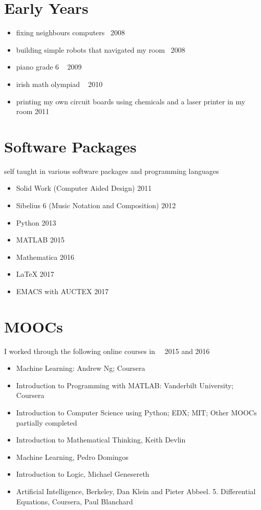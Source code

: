 \documentclass[paper=a4, fontsize=11pt]{scrartcl} %
\numberwithin{equation}{section} %
\numberwithin{figure}{section} %
\numberwithin{table}{section} %
\begin{document}
\section{Early Years}

\begin{itemize}
  \item fixing neighbours computers                    ~2008

  \item building simple robots that navigated my room  ~2008
  \item piano grade 6                                 ~ 2009
    
  \item irish math olympiad                           ~ 2010
  
  \item printing my own circuit boards using chemicals and a laser printer in my room 2011

\end{itemize}





\section{Software Packages}
     self taught in various software packages and programming languages
\begin{itemize}
\item Solid Work  (Computer Aided Design) 2011
\item Sibelius 6 (Music Notation and Composition) 2012
\item Python       2013
\item MATLAB       2015
\item Mathematica  2016
\item LaTeX        2017
\item EMACS with AUCTEX  2017

  \end{itemize}
\section{MOOCs}



I worked through the following online courses in ~~2015 and 2016

\begin{itemize}
\item  Machine Learning: Andrew Ng; Coursera
\item Introduction to Programming with MATLAB: Vanderbilt University; Coursera
\item Introduction to Computer Science using Python; EDX; MIT;
Other MOOCs partially completed
\item Introduction to Mathematical Thinking, Keith Devlin
\item Machine Learning, Pedro Domingos
\item Introduction to Logic, Michael Genesereth
\item Artificial Intelligence, Berkeley, Dan Klein and Pieter Abbeel. 5. Differential Equations, Coursera, Paul Blanchard
\end{itemize}
\end{document}
